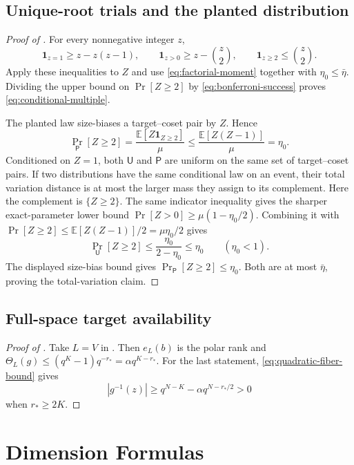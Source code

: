 \documentclass[11pt]{article}
\begin{document}
\subsection{Unique-root trials and the planted distribution}\label{app:proof-singleton-coset}

\begin{proof}[Proof of ]
For every nonnegative integer $z$,
\[
 \mathbf 1_{z=1}\ge z-z(z-1),\qquad
 \mathbf 1_{z>0}\ge z-\binom z2,\qquad
 \mathbf 1_{z\ge2}\le\binom z2.
\]
Apply these inequalities to $Z$ and use
\eqref{eq:factorial-moment} together with $\eta_0\le\bar\eta$.
Dividing the upper bound on $\Pr[Z\ge2]$ by
\eqref{eq:bonferroni-success} proves \eqref{eq:conditional-multiple}.

The planted law size-biases a target--coset pair by $Z$.  Hence
\[
 \Pr_{\mathsf P}[Z\ge2]
 =\frac{\mathbb E[Z\mathbf 1_{Z\ge2}]}{\mu}
 \le\frac{\mathbb E[Z(Z-1)]}{\mu}=\eta_0.
\]
Conditioned on $Z=1$, both $\mathsf U$ and $\mathsf P$ are uniform on the same
set of target--coset pairs.  If two distributions have the same conditional
law on an event, their total variation distance is at most the larger mass they
assign to its complement.  Here the complement is $\{Z\ge2\}$.  The same indicator inequality gives the sharper exact-parameter lower bound
$\Pr[Z>0]\ge\mu(1-\eta_0/2)$.  Combining it with
$\Pr[Z\ge2]\le\mathbb E[Z(Z-1)]/2=\mu\eta_0/2$ gives
\[
 \Pr_{\mathsf U}[Z\ge2]
 \le \frac{\eta_0}{2-\eta_0}\le\eta_0
 \qquad(\eta_0<1).
\]
The displayed size-bias bound gives
$\Pr_{\mathsf P}[Z\ge2]\le\eta_0$.  Both are at most $\bar\eta$, proving the
total-variation claim.
\end{proof}

\subsection{Full-space target availability}\label{app:proof-full-space}

\begin{proof}[Proof of ]
Take $L=V$ in .  Then $e_L(b)$ is the polar rank and
$\Theta_L(g)\le(q^K-1)q^{-r_*}=\alpha q^{K-r_*}$.  For the last statement, \eqref{eq:quadratic-fiber-bound} gives
\[
 |g^{-1}(z)|\ge q^{N-K}-\alpha q^{N-r_*/2}>0
\]
when $r_*\ge2K$.
\end{proof}

\section{Dimension Formulas}\label{app:dimensions}
\end{document}
